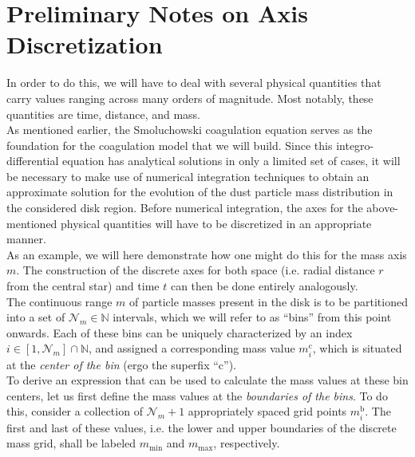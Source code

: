 
\clearpage\section{Preliminary Notes on Axis Discretization}
\label{sec:preliminary_notes_on_axis_discretization}

    In order to do this, we will have to deal with several physical quantities 
    that carry values ranging across many orders of magnitude. Most notably, these quantities are 
    time, distance, and mass. \\

    As mentioned earlier, the Smoluchowski coagulation equation serves as the foundation for the 
    coagulation model 
    that we will build. Since this integro-differential equation has analytical solutions in 
    only a limited set of cases, it will be necessary to make use of numerical integration 
    techniques to obtain an approximate solution for the evolution of the dust particle mass 
    distribution in the considered disk region. Before numerical integration, the axes for the 
    above-mentioned physical quantities will have to be discretized in an appropriate manner. \\

    As an example, we will here demonstrate how one might do this for the mass axis $m$. 
    The construction of the discrete axes for both space (i.e. radial distance $r$ from the 
    central star) and time $t$ can then be done entirely analogously. \\

    The continuous range $m$ of particle masses present in the disk is to be partitioned into a 
    set of $\mathcal N_m\in\mathbb N$ intervals, which we will refer to as ``bins'' from this 
    point onwards. Each of these bins can be uniquely characterized by an index 
    $i\in[1,\mathcal N_m]\cap\mathbb N$, and assigned a corresponding mass value $m_i^\text{c}$, 
    which is situated at the \textit{center of the bin} (ergo the superfix ``c'').\\
    
    To derive an expression that can be used to calculate the mass values at these bin centers, 
    let us first define the mass values at the \textit{boundaries of the bins}. To do this,
    consider a collection of $\mathcal N_m+1$ appropriately spaced grid points $m_i^\text{b}$. 
    The first and last of these values, i.e. the lower and upper boundaries of the discrete mass 
    grid, shall be labeled $m_\text{min}$ and $m_\text{max}$, respectively. \\

